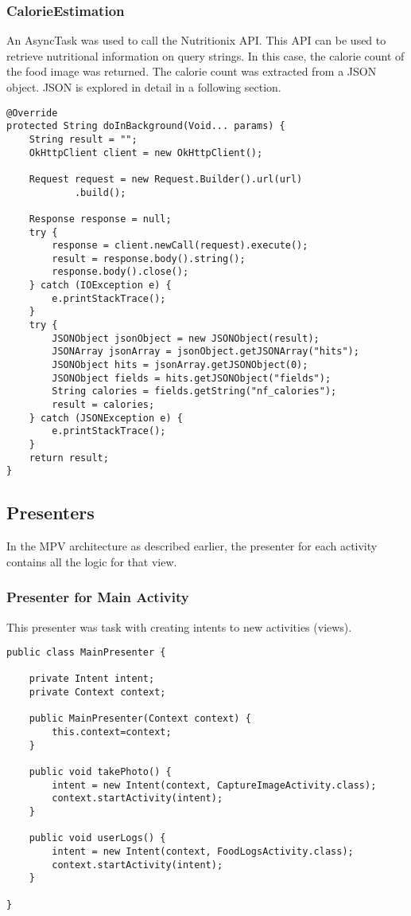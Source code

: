 \tocless\subsubsection{CalorieEstimation}
An AsyncTask was used to call the Nutritionix API.
This API can be used to retrieve nutritional information on query strings.
In this case, the calorie count of the food image was returned.
The calorie count was extracted from a JSON object.
JSON is explored in detail in a following section.
\begin{lstlisting}[style=Java]
@Override
protected String doInBackground(Void... params) {
    String result = "";
    OkHttpClient client = new OkHttpClient();

    Request request = new Request.Builder().url(url)
            .build();

    Response response = null;
    try {
        response = client.newCall(request).execute();
        result = response.body().string();
        response.body().close();
    } catch (IOException e) {
        e.printStackTrace();
    }
    try {
        JSONObject jsonObject = new JSONObject(result);
        JSONArray jsonArray = jsonObject.getJSONArray("hits");
        JSONObject hits = jsonArray.getJSONObject(0);
        JSONObject fields = hits.getJSONObject("fields");
        String calories = fields.getString("nf_calories");
        result = calories;
    } catch (JSONException e) {
        e.printStackTrace();
    }
    return result;
}
\end{lstlisting}

\tocless\subsection{Presenters}
In the MPV architecture as described earlier, the presenter for each activity contains all the logic for that view.

\tocless\subsubsection{Presenter for Main Activity}
This presenter was task with creating intents to new activities (views).
\begin{lstlisting}[style=Java]
public class MainPresenter {

    private Intent intent;
    private Context context;

    public MainPresenter(Context context) {
        this.context=context;
    }

    public void takePhoto() {
        intent = new Intent(context, CaptureImageActivity.class);
        context.startActivity(intent);
    }

    public void userLogs() {
        intent = new Intent(context, FoodLogsActivity.class);
        context.startActivity(intent);
    }

}
\end{lstlisting}

